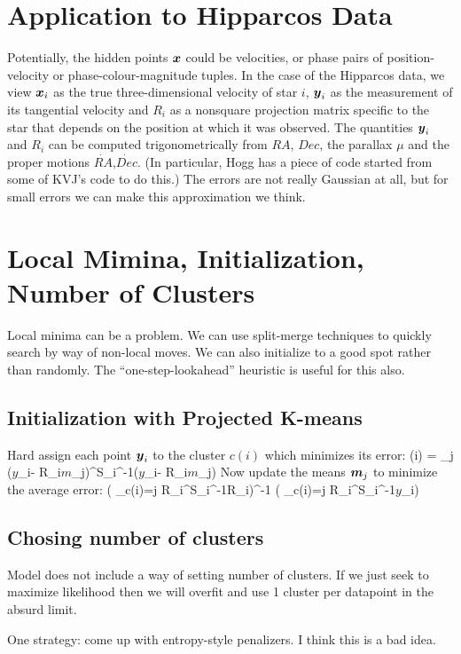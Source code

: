 \documentclass{article}
\def\beq#1\eeq{\begin{equation}#1\end{equation}}
\newcommand{\bv}[1]{\mbox{\boldmath ${#1}$}} %
\newcommand{\T}{^{\scriptscriptstyle \top}}
\newcommand{\inv}{^{-1}}
\newcommand{\<}{\langle}
\renewcommand{\>}{\rangle}
\newcommand{\xx}{\bv{x}}
\newcommand{\yyi}{\bv{y}_i}
\newcommand{\xxi}{\bv{x}_i}
\newcommand{\RRi}{R_i}
\newcommand{\SSi}{S_i}
\newcommand{\mmj}{\bv{m}_j}
\begin{document}
\section{Application to Hipparcos Data}
Potentially, the hidden points $\xx$ could be velocities, or phase
pairs of position-velocity or phase-colour-magnitude tuples.
In the case of the Hipparcos data, we view $\xxi$ as the true
three-dimensional velocity of star $i$, $\yyi$ as the measurement of
its tangential velocity and $\RRi$ as a nonsquare projection matrix
specific to the star that depends on the position at which it was
observed. The quantities $\yyi$ and $\RRi$ can be computed 
trigonometrically from $RA$, $Dec$, the parallax $\mu$ and
the proper motions $\dot{RA}$,$\dot{Dec}$. (In particular, Hogg has a
piece of code started from some of KVJ's code to do this.)
The errors are not really Gaussian at all, but for small errors
we can make this approximation we think.


\section{Local Mimina, Initialization, Number of Clusters}
Local minima can be a problem. We can use split-merge techniques
to quickly search by way of non-local moves. We can also initialize to
a good spot rather than randomly. The ``one-step-lookahead'' heuristic
is useful for this also.

\subsection{Initialization with Projected K-means}
Hard assign each point $\yyi$ to the cluster $c(i)$ which
minimizes its error:
\beq
c(i) = \arg\min_j \quad (\yyi - \RRi\mmj)\T\SSi\inv(\yyi - \RRi\mmj)
\eeq
Now update the means $\mmj$ to minimize the average error:
\beq
\mmj \leftarrow \left ( \sum_{c(i)=j} \RRi\T \SSi\inv \RRi \right )\inv 
\left ( \sum_{c(i)=j} \RRi\T\SSi\inv \yyi \right )
\eeq

\subsection{Chosing number of clusters}
Model does not include a way of setting number of clusters.
If we just seek to maximize likelihood then we will overfit
and use 1 cluster per datapoint in the absurd limit.

One strategy: come up with entropy-style penalizers. I think this is a
bad idea. 
\end{document}
